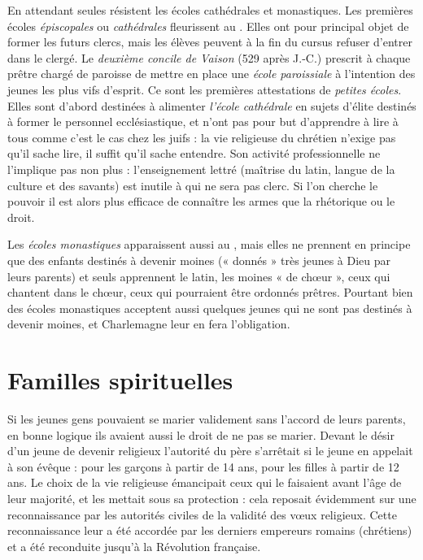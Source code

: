  En attendant seules résistent les écoles cathédrales et monastiques. Les premières écoles \emph{épiscopales} ou \emph{cathédrales} fleurissent au . Elles ont pour principal objet de former les futurs clercs, mais les élèves peuvent à la fin du cursus refuser d'entrer dans le clergé. Le \emph{deuxième concile de Vaison} (529 après J.-C.) prescrit à chaque prêtre chargé de paroisse de mettre en place une \emph{école paroissiale} à l'intention des jeunes les plus vifs d'esprit. Ce sont les premières attestations de \emph{petites écoles}. Elles sont d'abord destinées à alimenter \emph{l'école cathédrale} en sujets d'élite destinés à former le personnel ecclésiastique, et n'ont pas pour but d'apprendre à lire à tous comme c'est le cas chez les juifs : la vie religieuse du chrétien n'exige pas qu'il sache lire, il suffit qu'il sache entendre. Son activité professionnelle ne l'implique pas non plus : l'enseignement lettré (maîtrise du latin, langue de la culture et des savants) est inutile à qui ne sera pas clerc. Si l'on cherche le pouvoir il est alors plus efficace de connaître les armes que la rhétorique ou le droit. 
 
 Les \emph{écoles monastiques} apparaissent aussi au , mais elles ne prennent en principe que des enfants destinés à devenir moines (« donnés » très jeunes à Dieu par leurs parents) et seuls apprennent le latin, les moines « de chœur », ceux qui chantent dans le chœur, ceux qui pourraient être ordonnés prêtres. Pourtant bien des écoles monastiques acceptent aussi quelques jeunes qui ne sont pas destinés à devenir moines, et Charlemagne leur en fera l'obligation.
 
 


\section{Familles spirituelles}


 Si les jeunes gens pouvaient se marier validement sans l'accord de leurs parents, en bonne logique ils avaient aussi le droit de ne pas se marier. Devant le désir d'un jeune de devenir religieux l'autorité du père s'arrêtait si le jeune en appelait à son évêque : pour les garçons à partir de 14 ans, pour les filles à partir de 12 ans. Le choix de la vie religieuse émancipait ceux qui le faisaient avant l'âge de leur majorité, et les mettait sous sa protection : cela reposait évidemment sur une reconnaissance par les autorités civiles de la validité des vœux religieux. Cette reconnaissance leur a été accordée par les derniers empereurs romains (chrétiens) et a été reconduite jusqu'à la Révolution française.

